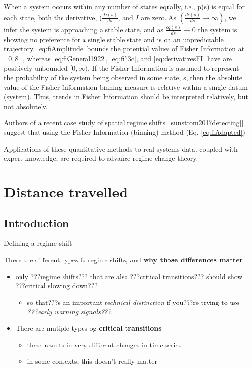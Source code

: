 \documentclass[12pt,twoside,openany]{reedthesis}
\providecommand{\tightlist}{%
  \setlength{\itemsep}{0pt}\setlength{\parskip}{0pt}}
\begin{document}
When a system occurs within any number of states equally, i.e., p(s) is
equal for each state, both the derivative, (\(\frac{dq(s)}{ds}\), and
\(I\) are zero. As \((\frac{dq(s)}{ds} \rightarrow \infty)\), we infer
the system is approaching a stable state, and as
\(\frac{dq(s)}{ds} \rightarrow 0\) the system is showing no preference
for a single stable state and is on an unpredictable trajectory.
\eqref{eq:fiAmplitude} bounds the potential values of Fisher Information
at \([0, 8]\), whereas \eqref{eq:fiGeneral1922}, \eqref{eq:fi73c}, and
\eqref{eq:derivativesFI} have are positively unbounded \([0, \infty)\). If
the Fisher Information is assumed to represent the probability of the
system being observed in some state, s, then the absolute value of the
Fisher Information binning measure is relative within a single datum
(system). Thus, trends in Fisher Information should be interpreted
relatively, but not absolutely.

Authors of a recent case study of spatial regime shifts
{[}\ref{sunstrom2017detecting}{]} suggest that using the Fisher
Information (binning) method (Eq. \eqref{eq:fiAdapted})

Applications of these quantitative methods to real systems data, coupled
with expert knowledge, are required to advance regime change theory.

\chapter{Distance travelled}\label{distance-chapter}

\section{Introduction}\label{introduction-3}

Defining a regime shift

There are different types fo regime shifts, and \textbf{why those
differences matter}
\begin{itemize}
\tightlist
\item
  only ???regime shifts??? that are also ???critical transitions???
  should show ???critical slowing down???
  \begin{itemize}
  \tightlist
  \item
    so that???s an important \emph{technical distinction} if you???re
    trying to use \emph{???early warning signals???}.\\
  \end{itemize}
\item
  There are mutiple types og \textbf{critical transitions}
  \begin{itemize}
  \tightlist
  \item
    these results in very different changes in time series\\
  \item
    in some contexts, this doesn't really matter
  \end{itemize}
\end{itemize}
\end{document}
